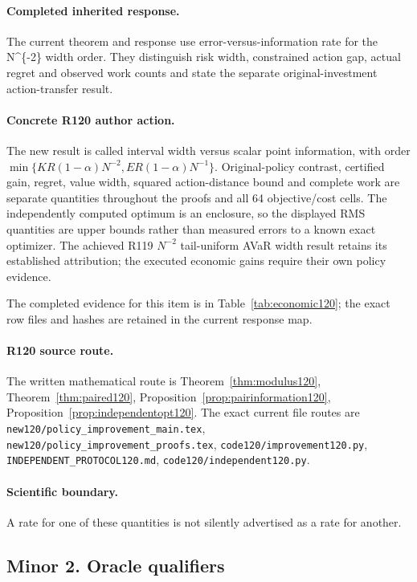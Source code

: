 \paragraph{Completed inherited response.}
The current theorem and response use error-versus-information rate for the N\textasciicircum{}\{-2\} width order. They distinguish risk width, constrained action gap, actual regret and observed work counts and state the separate original-investment action-transfer result.
\paragraph{Concrete R120 author action.}
The new result is called interval width versus scalar point information, with order $\min\{KR(1-\alpha)N^{-2},ER(1-\alpha)N^{-1}\}$. Original-policy contrast, certified gain, regret, value width, squared action-distance bound and complete work are separate quantities throughout the proofs and all 64 objective/cost cells. The independently computed optimum is an enclosure, so the displayed RMS quantities are upper bounds rather than measured errors to a known exact optimizer. The achieved R119 $N^{-2}$ tail-uniform AVaR width result retains its established attribution; the executed economic gains require their own policy evidence.

The completed evidence for this item is in Table~\ref{tab:economic120}; the exact row files and hashes are retained in the current response map.
\paragraph{R120 source route.}
The written mathematical route is Theorem~\ref{thm:modulus120}, Theorem~\ref{thm:paired120}, Proposition~\ref{prop:pairinformation120}, Proposition~\ref{prop:independentopt120}. The exact current file routes are \nolinkurl{new120/policy_improvement_main.tex}, \nolinkurl{new120/policy_improvement_proofs.tex}, \nolinkurl{code120/improvement120.py}, \nolinkurl{INDEPENDENT_PROTOCOL120.md}, \nolinkurl{code120/independent120.py}.
\paragraph{Scientific boundary.}
A rate for one of these quantities is not silently advertised as a rate for another.

\subsection{Minor 2. Oracle qualifiers}
\label{response120:minor-2}
